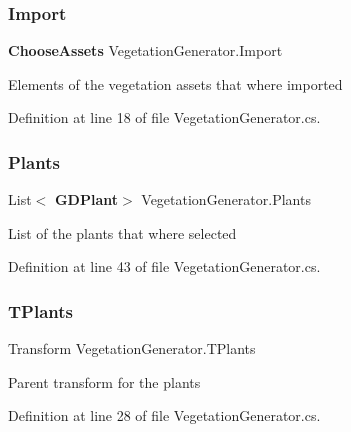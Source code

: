 \mbox{\label{class_vegetation_generator_a519539bde478c2603c7abe17e7ba31e3}} 
\subsubsection{Import}
{\footnotesize\ttfamily \textbf{ Choose\+Assets} Vegetation\+Generator.\+Import}



Elements of the vegetation assets that where imported 



Definition at line 18 of file Vegetation\+Generator.\+cs.

\mbox{\label{class_vegetation_generator_a86daf4c4b243d24071e2b9850d19b985}} 
\subsubsection{Plants}
{\footnotesize\ttfamily List$<$\textbf{ G\+D\+Plant}$>$ Vegetation\+Generator.\+Plants}



List of the plants that where selected 



Definition at line 43 of file Vegetation\+Generator.\+cs.

\mbox{\label{class_vegetation_generator_a92c54788fc3571d4146b6e07ed89f388}} 
\subsubsection{T\+Plants}
{\footnotesize\ttfamily Transform Vegetation\+Generator.\+T\+Plants}



Parent transform for the plants 



Definition at line 28 of file Vegetation\+Generator.\+cs.

\mbox{\label{class_vegetation_generator_aab661132e8945da3ae507ff9bc61e589}} 
